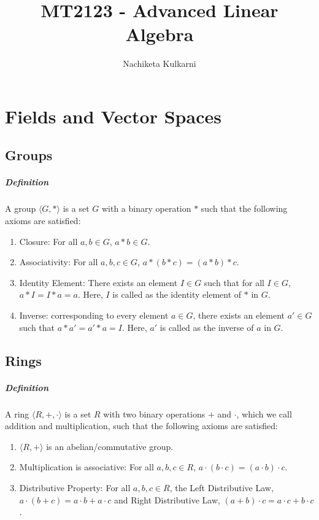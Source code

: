 \documentclass[12pt, oneside]{book}
\date{}
\title{MT2123 - Advanced Linear Algebra}
\author{Nachiketa Kulkarni}
\begin{document}
\maketitle
\tableofcontents

\mainmatter
\chapter{Fields and Vector Spaces}
\section{Groups}
\paragraph{Definition} A group \( \langle G, \ast \rangle \) is a set \( G \) with a binary operation \( \ast \) such that the following axioms are satisfied:
\begin{enumerate}
    \item Closure: For all \( a, b \in G \), \( a \ast b \in G \).
    \item Associativity: For all \( a, b, c \in G \), \( a \ast (b \ast c) = (a \ast b) \ast c \).
    \item Identity Element: There exists an element \( I \in G \) such that for all \( I \in G \), \( a \ast I = I \ast a = a \). Here, \( I \) is called as the identity element of \( \ast \) in \( G \).
    \item Inverse: corresponding to every element \( a \in G \), there exists an element \( a' \in G \) such that \( a \ast a' = a' \ast a = I \). Here, \( a' \) is called as the inverse of \( a \) in \( G \).
\end{enumerate}
\section{Rings}
\paragraph{Definition} A ring \( \langle R, +, \cdot \rangle \) is a set \( R \) with two binary operations \( + \) and \( \cdot \), which we call addition and multiplication, such that the following axioms are satisfied:
\begin{enumerate}
    \item \( \langle R, + \rangle \) is an abelian/commutative group. 
    \item Multiplication is associative: For all \( a, b, c \in R \), \( a \cdot (b \cdot c) = (a \cdot b) \cdot c \).
    \item Distributive Property: For all \( a, b, c \in R \), the Left Distributive Law, \( a \cdot (b + c) = a \cdot b + a \cdot c \) and Right Distributive Law, \( (a + b) \cdot c = a \cdot c + b \cdot c \).
\end{enumerate}
\end{document}

